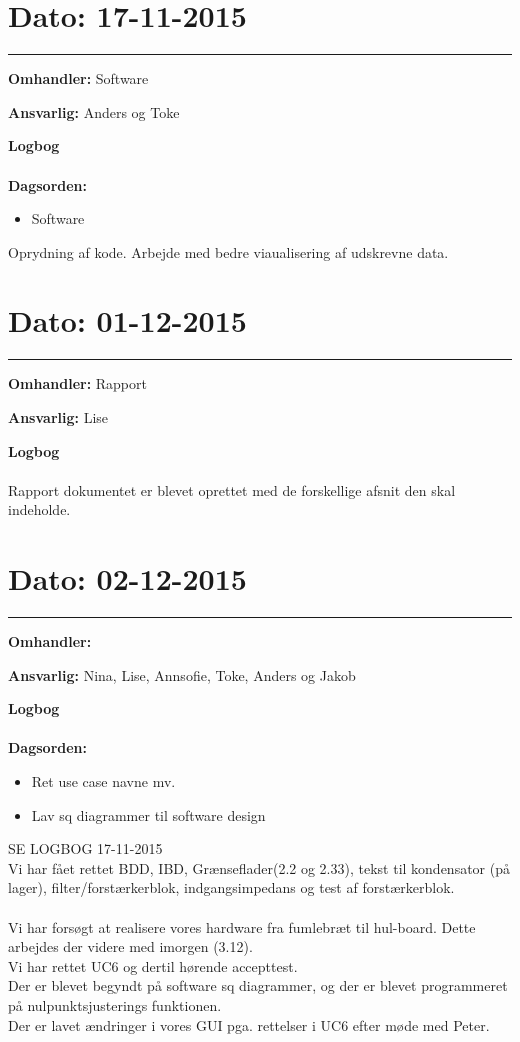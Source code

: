 \section{Dato: 17-11-2015 }
\hrule

\textbf{Omhandler:} Software

\textbf{Ansvarlig:} Anders og Toke

\textbf{Logbog}
\\
\\
\textbf{Dagsorden:}
\begin{itemize}
	\item Software
\end{itemize}

Oprydning af kode. Arbejde med bedre viaualisering af udskrevne data. 



\section{Dato: 01-12-2015 }
\hrule

\textbf{Omhandler:} Rapport

\textbf{Ansvarlig:} Lise

\textbf{Logbog}
\\
\\
Rapport dokumentet er blevet oprettet med de forskellige afsnit den skal indeholde. 




\section{Dato: 02-12-2015 }
\hrule

\textbf{Omhandler:} 

\textbf{Ansvarlig:} Nina, Lise, Annsofie, Toke, Anders og Jakob

\textbf{Logbog}
\\
\\
\textbf{Dagsorden:}
\begin{itemize}
	\item Ret use case navne mv.
	\item Lav sq diagrammer til software design
\end{itemize}

SE LOGBOG 17-11-2015 \\
Vi har fået rettet BDD, IBD, Grænseflader(2.2 og 2.33), tekst til kondensator (på lager), filter/forstærkerblok, indgangsimpedans og test af forstærkerblok.
\\
\\
Vi har forsøgt at realisere vores hardware fra fumlebræt til hul-board. Dette arbejdes der videre med imorgen (3.12).\\
Vi har rettet UC6 og dertil hørende accepttest. \\
Der er blevet begyndt på software sq diagrammer, og der er blevet programmeret på nulpunktsjusterings funktionen. \\
Der er lavet ændringer i vores GUI pga. rettelser i UC6 efter møde med Peter.
	
